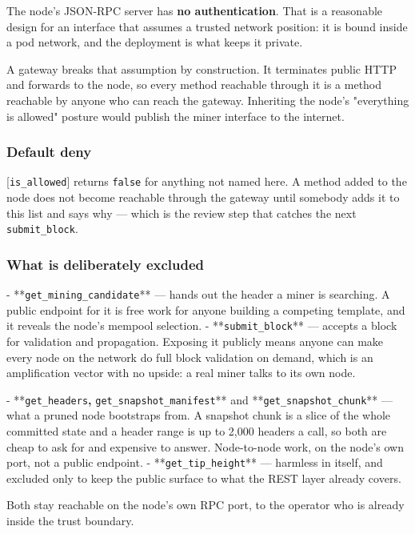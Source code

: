 \documentclass[11pt,a4paper]{article}
\begin{document}
The node's JSON-RPC server has \textbf{no authentication}. That is a reasonable
design for an interface that assumes a trusted network position: it is bound
inside a pod network, and the deployment is what keeps it private.

A gateway breaks that assumption by construction. It terminates public HTTP
and forwards to the node, so every method reachable through it is a method
reachable by anyone who can reach the gateway. Inheriting the node's
"everything is allowed" posture would publish the miner interface to the
internet.

\subsubsection{Default deny}

[\texttt{is\_allowed}] returns \texttt{false} for anything not named here. A method added
to the node does not become reachable through the gateway until somebody
adds it to this list and says why — which is the review step that catches
the next \texttt{submit\_block}.

\subsubsection{What is deliberately excluded}

- **\texttt{get\_mining\_candidate}** — hands out the header a miner is searching. A
  public endpoint for it is free work for anyone building a competing
  template, and it reveals the node's mempool selection.
- **\texttt{submit\_block}** — accepts a block for validation and propagation.
  Exposing it publicly means anyone can make every node on the network do
  full block validation on demand, which is an amplification vector with no
  upside: a real miner talks to its own node.

- **\texttt{get\_headers}\textbf{, }\texttt{get\_snapshot\_manifest}** and
  **\texttt{get\_snapshot\_chunk}** — what a pruned node bootstraps from. A snapshot
  chunk is a slice of the whole committed state and a header range is up to
  2,000 headers a call, so both are cheap to ask for and expensive to
  answer. Node-to-node work, on the node's own port, not a public endpoint.
- **\texttt{get\_tip\_height}** — harmless in itself, and excluded only to keep the
  public surface to what the REST layer already covers.

Both stay reachable on the node's own RPC port, to the operator who is
already inside the trust boundary.
\end{document}
